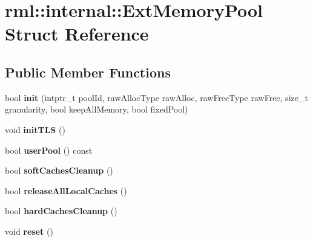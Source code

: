 \hypertarget{structrml_1_1internal_1_1ExtMemoryPool}{}\section{rml\+:\+:internal\+:\+:Ext\+Memory\+Pool Struct Reference}
\label{structrml_1_1internal_1_1ExtMemoryPool}
\subsection*{Public Member Functions}
\begin{DoxyCompactItemize}
\item 
\hypertarget{structrml_1_1internal_1_1ExtMemoryPool_ae8e7d952a9a6dbb43605a290997a6cc6}{}bool {\bfseries init} (intptr\+\_\+t pool\+Id, raw\+Alloc\+Type raw\+Alloc, raw\+Free\+Type raw\+Free, size\+\_\+t granularity, bool keep\+All\+Memory, bool fixed\+Pool)\label{structrml_1_1internal_1_1ExtMemoryPool_ae8e7d952a9a6dbb43605a290997a6cc6}

\item 
\hypertarget{structrml_1_1internal_1_1ExtMemoryPool_a8b8a918d2c8cec62ab010730d7640fb2}{}void {\bfseries init\+T\+L\+S} ()\label{structrml_1_1internal_1_1ExtMemoryPool_a8b8a918d2c8cec62ab010730d7640fb2}

\item 
\hypertarget{structrml_1_1internal_1_1ExtMemoryPool_a633fd7be731f762090f16f4e7ee6601e}{}bool {\bfseries user\+Pool} () const \label{structrml_1_1internal_1_1ExtMemoryPool_a633fd7be731f762090f16f4e7ee6601e}

\item 
\hypertarget{structrml_1_1internal_1_1ExtMemoryPool_ae52e603c56025cd8d5fe2f84b21ba442}{}bool {\bfseries soft\+Caches\+Cleanup} ()\label{structrml_1_1internal_1_1ExtMemoryPool_ae52e603c56025cd8d5fe2f84b21ba442}

\item 
\hypertarget{structrml_1_1internal_1_1ExtMemoryPool_a47b9aace2f0d1d465a4aa47a489c464b}{}bool {\bfseries release\+All\+Local\+Caches} ()\label{structrml_1_1internal_1_1ExtMemoryPool_a47b9aace2f0d1d465a4aa47a489c464b}

\item 
\hypertarget{structrml_1_1internal_1_1ExtMemoryPool_ac31ca686fe2deb68ac82bc4ad23feeb2}{}bool {\bfseries hard\+Caches\+Cleanup} ()\label{structrml_1_1internal_1_1ExtMemoryPool_ac31ca686fe2deb68ac82bc4ad23feeb2}

\item 
\hypertarget{structrml_1_1internal_1_1ExtMemoryPool_afe0a6de53af23232c29ebd49fa7453ee}{}void {\bfseries reset} ()\label{structrml_1_1internal_1_1ExtMemoryPool_afe0a6de53af23232c29ebd49fa7453ee}


\end{DoxyCompactItemize}
